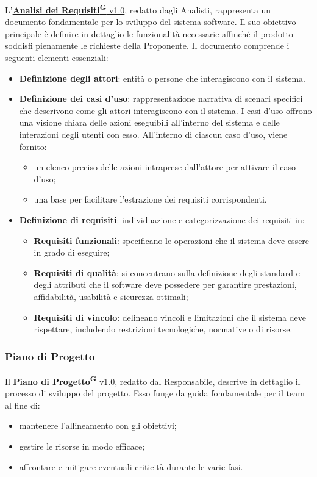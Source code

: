 L'\href{https://code7crusaders.github.io/docs/RTB/documentazione_interna/glossario.html#analisi-dei-requisiti}{\textbf{Analisi dei Requisiti\textsuperscript{G}} v1.0}, redatto dagli Analisti, rappresenta un documento fondamentale per lo sviluppo del sistema software. Il suo obiettivo principale è definire in dettaglio le funzionalità necessarie affinché il prodotto soddisfi pienamente le richieste della Proponente.
Il documento comprende i seguenti elementi essenziali:
\begin{itemize}
    \item \textbf{Definizione degli attori}: entità o persone che interagiscono con il sistema.
    \item \textbf{Definizione dei casi d’uso}: rappresentazione narrativa di scenari specifici che descrivono come gli attori interagiscono con il sistema. I casi d’uso offrono una visione chiara delle azioni eseguibili all’interno del sistema e delle interazioni degli utenti con esso. All’interno di ciascun caso d’uso, viene fornito:
    \begin{itemize}
        \item un elenco preciso delle azioni intraprese dall’attore per attivare il caso d’uso;
        \item una base per facilitare l’estrazione dei requisiti corrispondenti.
    \end{itemize}
    \item \textbf{Definizione di requisiti}: individuazione e categorizzazione dei requisiti in:
    \begin{itemize}
        \item \textbf{Requisiti funzionali}: specificano le operazioni che il sistema deve essere in grado di eseguire;
        \item \textbf{Requisiti di qualità}: si concentrano sulla definizione degli standard e degli attributi che il software deve possedere per garantire prestazioni, affidabilità, usabilità e sicurezza ottimali;
        \item \textbf{Requisiti di vincolo}: delineano vincoli e limitazioni che il sistema deve rispettare, includendo restrizioni tecnologiche, normative o di risorse.
    \end{itemize}
\end{itemize}

\subsubsection{Piano di Progetto}
Il \href{https://code7crusaders.github.io/docs/RTB/documentazione_interna/glossario.html#piano-di-progetto}{\textbf{Piano di Progetto\textsuperscript{G}} v1.0}, redatto dal Responsabile, descrive in dettaglio il processo di sviluppo del progetto. Esso funge da guida fondamentale per il team al fine di:
\begin{itemize}
    \item mantenere l’allineamento con gli obiettivi;
    \item gestire le risorse in modo efficace;
    \item affrontare e mitigare eventuali criticità durante le varie fasi.
\end{itemize}

